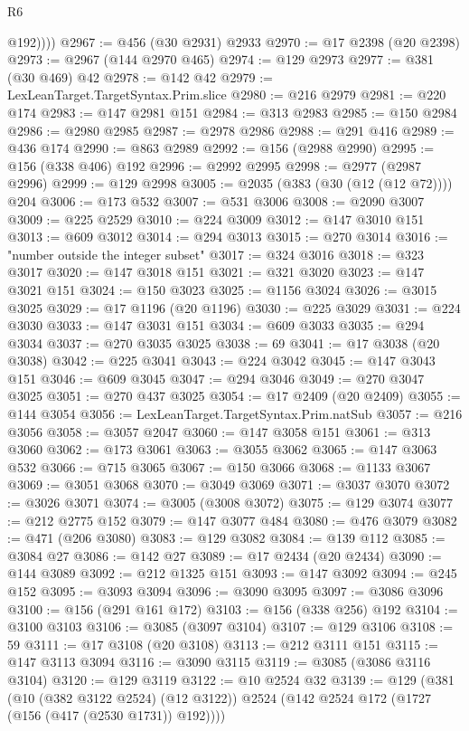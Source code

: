 \begin{lexlean}{R6}
\begin{coremodule}
            @192))))
@2967 := @456 (@30 @2931) @2933
@2970 := @17 @2398 (@20 @2398)
@2973 := @2967 (@144 @2970 @465)
@2974 := @129 @2973
@2977 := @381 (@30 @469) @42
@2978 := @142 @42
@2979 := LexLeanTarget.TargetSyntax.Prim.slice
@2980 := @216 @2979
@2981 := @220 @174
@2983 := @147 @2981 @151
@2984 := @313 @2983
@2985 := @150 @2984
@2986 := @2980 @2985
@2987 := @2978 @2986
@2988 := @291 @416
@2989 := @436 @174
@2990 := @863 @2989
@2992 := @156 (@2988 @2990)
@2995 := @156 (@338 @406) @192
@2996 := @2992 @2995
@2998 := @2977 (@2987 @2996)
@2999 := @129 @2998
@3005 := @2035 (@383 (@30 (@12 (@12 @72)))) @204
@3006 := @173 @532
@3007 := @531 @3006
@3008 := @2090 @3007
@3009 := @225 @2529
@3010 := @224 @3009
@3012 := @147 @3010 @151
@3013 := @609 @3012
@3014 := @294 @3013
@3015 := @270 @3014
@3016 := "number outside the integer subset"
@3017 := @324 @3016
@3018 := @323 @3017
@3020 := @147 @3018 @151
@3021 := @321 @3020
@3023 := @147 @3021 @151
@3024 := @150 @3023
@3025 := @1156 @3024
@3026 := @3015 @3025
@3029 := @17 @1196 (@20 @1196)
@3030 := @225 @3029
@3031 := @224 @3030
@3033 := @147 @3031 @151
@3034 := @609 @3033
@3035 := @294 @3034
@3037 := @270 @3035 @3025
@3038 := 69
@3041 := @17 @3038 (@20 @3038)
@3042 := @225 @3041
@3043 := @224 @3042
@3045 := @147 @3043 @151
@3046 := @609 @3045
@3047 := @294 @3046
@3049 := @270 @3047 @3025
@3051 := @270 @437 @3025
@3054 := @17 @2409 (@20 @2409)
@3055 := @144 @3054
@3056 := LexLeanTarget.TargetSyntax.Prim.natSub
@3057 := @216 @3056
@3058 := @3057 @2047
@3060 := @147 @3058 @151
@3061 := @313 @3060
@3062 := @173 @3061
@3063 := @3055 @3062
@3065 := @147 @3063 @532
@3066 := @715 @3065
@3067 := @150 @3066
@3068 := @1133 @3067
@3069 := @3051 @3068
@3070 := @3049 @3069
@3071 := @3037 @3070
@3072 := @3026 @3071
@3074 := @3005 (@3008 @3072)
@3075 := @129 @3074
@3077 := @212 @2775 @152
@3079 := @147 @3077 @484
@3080 := @476 @3079
@3082 := @471 (@206 @3080)
@3083 := @129 @3082
@3084 := @139 @112
@3085 := @3084 @27
@3086 := @142 @27
@3089 := @17 @2434 (@20 @2434)
@3090 := @144 @3089
@3092 := @212 @1325 @151
@3093 := @147 @3092
@3094 := @245 @152
@3095 := @3093 @3094
@3096 := @3090 @3095
@3097 := @3086 @3096
@3100 := @156 (@291 @161 @172)
@3103 := @156 (@338 @256) @192
@3104 := @3100 @3103
@3106 := @3085 (@3097 @3104)
@3107 := @129 @3106
@3108 := 59
@3111 := @17 @3108 (@20 @3108)
@3113 := @212 @3111 @151
@3115 := @147 @3113 @3094
@3116 := @3090 @3115
@3119 := @3085 (@3086 @3116 @3104)
@3120 := @129 @3119
@3122 := @10 @2524 @32
@3139 := @129
    (@381
      (@10 (@382 @3122 @2524) (@12 @3122))
      @2524
      (@142 @2524 @172 (@1727 (@156 (@417 (@2530 @1731)) @192))))

\end{coremodule}
\end{lexlean}
